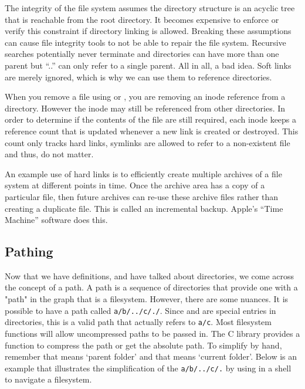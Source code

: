 The integrity of the file system assumes the directory structure is an acyclic tree that is reachable from the root directory.
It becomes expensive to enforce or verify this constraint if directory linking is allowed.
Breaking these assumptions can cause file integrity tools to not be able to repair the file system.
Recursive searches potentially never terminate and directories can have more than one parent but ``..'' can only refer to a single parent.
All in all, a bad idea.
Soft links are merely ignored, which is why we can use them to reference directories.

When you remove a file using  or , you are removing an inode reference from a directory.
However the inode may still be referenced from other directories.
In order to determine if the contents of the file are still required, each inode keeps a reference count that is updated whenever a new link is created or destroyed.
This count only tracks hard links, symlinks are allowed to refer to a non-existent file and thus, do not matter.

An example use of hard links is to efficiently create multiple archives of a file system at different points in time.
Once the archive area has a copy of a particular file, then future archives can re-use these archive files rather than creating a duplicate file.
This is called an incremental backup.
Apple's ``Time Machine'' software does this.

\subsection{Pathing}

Now that we have definitions, and have talked about directories, we come across the concept of a path.
A path is a sequence of directories that provide one with a "path" in the graph that is a filesystem.
However, there are some nuances.
It is possible to have a path called \texttt{a/b/../c/./}.
Since  and  are special entries in directories, this is a valid path that actually refers to \texttt{a/c}.
Most filesystem functions will allow uncompressed paths to be passed in.
The C library provides a function  to compress the path or get the absolute path.
To simplify by hand, remember that  means `parent folder' and that  means `current folder'.
Below is an example that illustrates the simplification of the \texttt{a/b/../c/.} by using  in a shell to navigate a filesystem.

